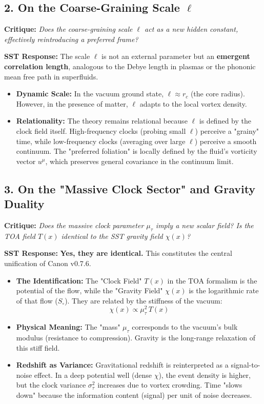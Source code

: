 \documentclass[10pt]{article}
\begin{document}
\subsection*{2. On the Coarse-Graining Scale $\ell$}
\noindent \textbf{Critique:} \textit{Does the coarse-graining scale $\ell$ act as a new hidden constant, effectively reintroducing a preferred frame?}

\noindent \textbf{SST Response:}
The scale $\ell$ is not an external parameter but an \textbf{emergent correlation length}, analogous to the Debye length in plasmas or the phononic mean free path in superfluids.
\begin{itemize}
    \item \textbf{Dynamic Scale:} In the vacuum ground state, $\ell \approx r_c$ (the core radius). However, in the presence of matter, $\ell$ adapts to the local vortex density.
    \item \textbf{Relationality:} The theory remains relational because $\ell$ is defined by the clock field itself. High-frequency clocks (probing small $\ell$) perceive a "grainy" time, while low-frequency clocks (averaging over large $\ell$) perceive a smooth continuum. The "preferred foliation" is locally defined by the fluid's vorticity vector $u^\mu$, which preserves general covariance in the continuum limit.
\end{itemize}

\subsection*{3. On the "Massive Clock Sector" and Gravity Duality}\label{sec:massive-clock-gravity}
\noindent \textbf{Critique:} \textit{Does the massive clock parameter $\mu_\tau$ imply a new scalar field? Is the TOA field $T(x)$ identical to the SST gravity field $\chi(x)$?}

\noindent \textbf{SST Response:}
\textbf{Yes, they are identical.} This constitutes the central unification of Canon v0.7.6.
\begin{itemize}
    \item \textbf{The Identification:} The "Clock Field" $T(x)$ in the TOA formalism is the potential of the flow, while the "Gravity Field" $\chi(x)$ is the logarithmic rate of that flow ($S_\circ$). They are related by the stiffness of the vacuum:
    \begin{equation}
        \chi(x) \propto \mu_\tau^2 \, T(x)
    \end{equation}
    \item \textbf{Physical Meaning:} The "mass" $\mu_\tau$ corresponds to the vacuum's bulk modulus (resistance to compression). Gravity is the long-range relaxation of this stiff field.
    \item \textbf{Redshift as Variance:} Gravitational redshift is reinterpreted as a signal-to-noise effect. In a deep potential well (dense $\chi$), the event density is higher, but the clock variance $\sigma_\tau^2$ increases due to vortex crowding. Time "slows down" because the information content (signal) per unit of noise decreases.
\end{itemize}
\end{document}
